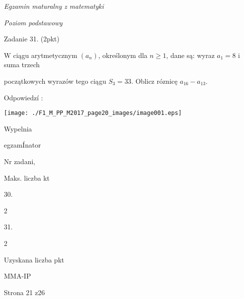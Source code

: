 \documentclass[a4paper,12pt]{article}
\begin{document}
{\it Egzamin maturalny z matematyki}

{\it Poziom podstawowy}

Zadanie 31. (2pkt)

$\mathrm{W}$ ciągu arytmetycznym $(a_{n})$, określonym dla $n\geq 1$, dane są: wyraz $a_{1}=8$ i suma trzech

początkowych wyrazów tego ciągu $S_{3}=33$. Oblicz róznicę $a_{16}-a_{13}.$

Odpowiedzí :
\begin{center}
\texttt{[image: ./F1\_M\_PP\_M2017\_page20\_images/image001.eps]}
\end{center}
Wypelnia

egzamÍnator

Nr zadani,

Maks. liczba kt

30.

2

31.

2

Uzyskana liczba pkt

MMA-IP

Strona 21 z26
\end{document}
